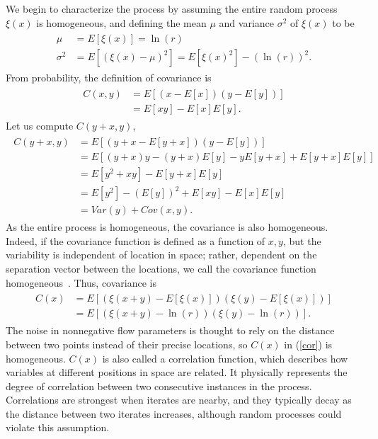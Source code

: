 We begin to characterize the process by
assuming the entire random process $\xi(x)$ is homogeneous, and defining the mean $\mu$ and variance $\sigma^2$
of $\xi(x)$ to be
\begin{align}
\begin{split}\label{ximean}
\mu &= E[\xi(x)] = \ln(r)\\
\sigma^2 &= E[(\xi(x) - \mu)^2]=E[\xi(x)^2]-(\ln(r))^2.
\end{split}
\end{align}
From probability, the definition of covariance is~\cite{ross}
\begin{align*}
\begin{split}
C(x,y) &= E[(x - E[x])(y - E[y])]\\
&= E[xy] - E[x]E[y].
\end{split}
\end{align*}
Let us compute $C(y+x,y)$,
\begin{align*}
\begin{split}
C(y+x,y) &= E[(y+x - E[y+x])(y - E[y])]\\
&= E[ (y+x)y - (y+x)E[y] -yE[y+x] + E[y+x]E[y] ]\\
&= E[y^2 + xy] - E[y+x]E[y] \\
&= E[y^2] - (E[y])^2 + E[xy] - E[x]E[y]\\
&= Var(y) + Cov(x,y).
\end{split}
\end{align*}
As the entire process is homogeneous, the covariance is also
homogeneous. Indeed, if the covariance function is defined as a function of $x,y$, but the
variability is independent of location in space; rather, dependent on
the separation vector between the locations, we call the covariance
function homogeneous~\cite{gelhar}. Thus, covariance is
\begin{align}
\begin{split}\label{cor}
C(x) &= E[(\xi(x+y) - E[\xi(x)])(\xi(y)-E[\xi(x)])] \\
&= E[(\xi(x+y) -\ln(r))(\xi(y)-\ln(r))]. 
\end{split}
\end{align}
The noise in nonnegative flow parameters is
thought to rely on the distance between two points instead of their
precise locations, so $C(x)$ in (\ref{cor}) is
homogeneous. $C(x)$ is also called a correlation function, which
describes how variables at different positions in space are
related. It physically represents the degree of correlation between
two consecutive instances in the process. Correlations are strongest
when iterates are nearby, and they typically decay as the distance
between two iterates increases, although random processes could violate this assumption. 

